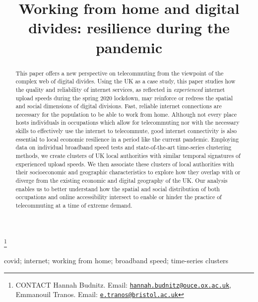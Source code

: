 \documentclass[]{interact}
\theoremstyle{plain}%
\theoremstyle{definition}
\theoremstyle{remark}
\begin{document}
\articletype{}

\title{Working from home and digital divides: resilience during the pandemic}


\author{
}

\thanks{CONTACT Hannah Budnitz. Email: \href{mailto:hannah.budnitz@ouce.ox.ac.uk}{\nolinkurl{hannah.budnitz@ouce.ox.ac.uk}}, Emmanouil Tranos. Email: \href{mailto:e.tranos@bristol.ac.uk}{\nolinkurl{e.tranos@bristol.ac.uk}}}

\maketitle

\begin{abstract}
This paper offers a new perspective on telecommuting from the viewpoint
of the complex web of digital divides. Using the UK as a case study,
this paper studies how the quality and reliability of internet services,
as reflected in \emph{experienced} internet upload speeds during the
spring 2020 lockdown, may reinforce or redress the spatial and social
dimensions of digital divisions. Fast, reliable internet connections are
necessary for the population to be able to work from home. Although not
every place hosts individuals in occupations which allow for
telecommuting nor with the necessary skills to effectively use the
internet to telecommute, good internet connectivity is also essential to
local economic resilience in a period like the current pandemic.
Employing data on individual broadband speed tests and state-of-the-art
time-series clustering methods, we create clusters of UK local
authorities with similar temporal signatures of experienced upload
speeds. We then associate these clusters of local authorities with their
socioeconomic and geographic characteristics to explore how they overlap
with or diverge from the existing economic and digital geography of the
UK. Our analysis enables us to better understand how the spatial and
social distribution of both occupations and online accessibility
intersect to enable or hinder the practice of telecommuting at a time of
extreme demand.
\end{abstract}

\begin{keywords}
covid; internet; working from home; broadband speed; time-series
clusters
\end{keywords}
\end{document}
